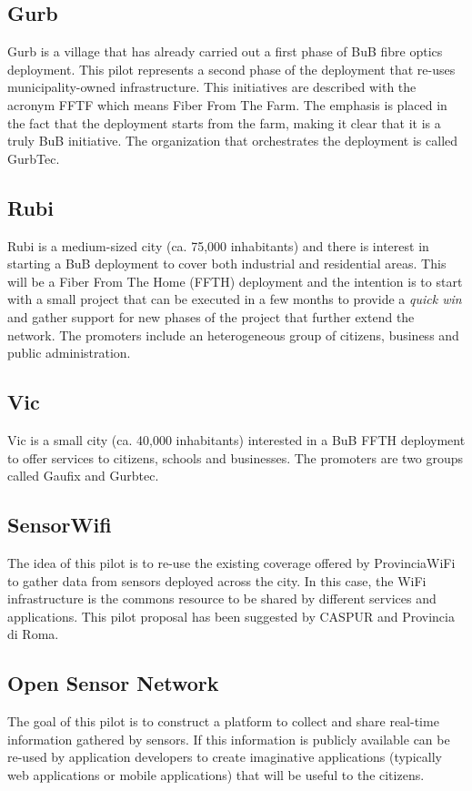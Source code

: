 \documentclass[conference]{IEEEtran}
\begin{document}
\subsection{Gurb}
Gurb is a village that has already carried out a first phase of BuB fibre optics deployment.
This pilot represents a second phase of the deployment that re-uses municipality-owned infrastructure.
This initiatives are described with the acronym FFTF which means Fiber From The Farm.
The emphasis is placed in the fact that the deployment starts from the farm, making it clear that it is a truly BuB initiative.
The organization that orchestrates the deployment is called GurbTec.

\subsection{Rubi}
Rubi is a medium-sized city (ca. 75,000 inhabitants) and there is interest in starting a BuB deployment to cover both industrial and residential areas.
This will be a Fiber From The Home (FFTH) deployment and the intention is to start with a small project that can be executed in a few months to provide a \emph{quick win} and gather support for new phases of the project that further extend the network.
The promoters include an heterogeneous group of citizens, business and public administration.

\subsection{Vic}
Vic is a small city (ca. 40,000 inhabitants) interested in a BuB FFTH deployment to offer services to citizens, schools and businesses.
The promoters are two groups called Gaufix and Gurbtec.

\subsection{SensorWifi}
The idea of this pilot is to re-use the existing coverage offered by ProvinciaWiFi to gather data from sensors deployed across the city.
In this case, the WiFi infrastructure is the commons resource to be shared by different services and applications.
This pilot proposal has been suggested by CASPUR and Provincia di Roma.

\subsection{Open Sensor Network}
The goal of this pilot is to construct a platform to collect and share real-time information gathered by sensors.
If this information is publicly available can be re-used by application developers to create imaginative applications (typically web applications or mobile applications) that will be useful to the citizens.
\end{document}
